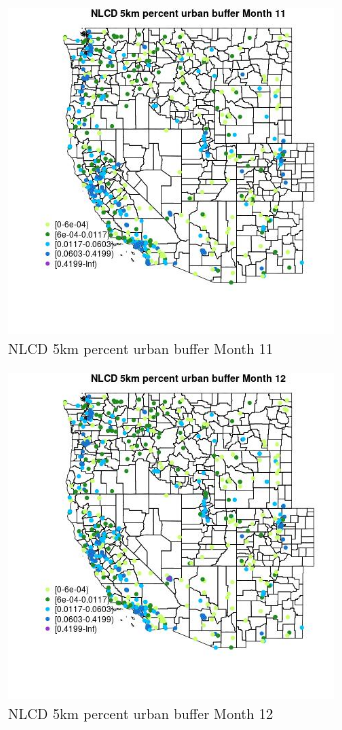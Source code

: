 \begin{figure} 
\centering  
\includegraphics[width=0.77\textwidth]{Code_Outputs/Report_ML_input_PM25_Step4_part_e_de_duplicated_aves_compiled_2019-05-14wNAs_MapObsMo11NLCD_5km_percent_urban_buffer.jpg} 
\caption{\label{fig:Report_ML_input_PM25_Step4_part_e_de_duplicated_aves_compiled_2019-05-14wNAsMapObsMo11NLCD_5km_percent_urban_buffer}NLCD 5km percent urban buffer Month 11} 
\end{figure} 
 

\begin{figure} 
\centering  
\includegraphics[width=0.77\textwidth]{Code_Outputs/Report_ML_input_PM25_Step4_part_e_de_duplicated_aves_compiled_2019-05-14wNAs_MapObsMo12NLCD_5km_percent_urban_buffer.jpg} 
\caption{\label{fig:Report_ML_input_PM25_Step4_part_e_de_duplicated_aves_compiled_2019-05-14wNAsMapObsMo12NLCD_5km_percent_urban_buffer}NLCD 5km percent urban buffer Month 12} 
\end{figure} 
 


